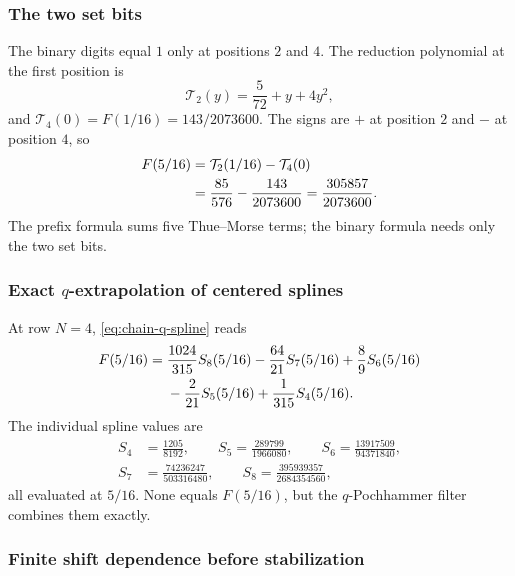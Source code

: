 \documentclass[11pt,oneside]{article}
\theoremstyle{definition}
\theoremstyle{remark}
\begin{document}
\subsubsection{The two set bits}

The binary digits equal $1$ only at positions $2$ and $4$.  The reduction polynomial at the
first position is
\begin{equation}
 \mathcal T_2(y)=\frac5{72}+y+4y^2,                        \label{eq:T2-explicit}
\end{equation}
and
\(
 \mathcal T_4(0)=F(1/16)=143/2073600.
\)
The signs are $+$ at position $2$ and $-$ at position $4$, so
\begin{align}
 F(5/16)
 &=\mathcal T_2(1/16)-\mathcal T_4(0)                     \notag\\
 &=\frac{85}{576}-\frac{143}{2073600}
 =\frac{305857}{2073600}.                                 \label{eq:five-sixteen-binary}
\end{align}
The prefix formula sums five Thue--Morse terms; the binary formula needs only the two set bits.

\subsubsection[Exact q-extrapolation of centered splines]{Exact $q$-extrapolation of centered splines}

At row $N=4$, \eqref{eq:chain-q-spline} reads
\begin{align}
 F(5/16)
 ={}&\frac{1024}{315}S_8(5/16)
 -\frac{64}{21}S_7(5/16)
 +\frac89S_6(5/16)                                      \notag\\
 &-\frac2{21}S_5(5/16)
 +\frac1{315}S_4(5/16).                                  \label{eq:five-sixteen-q-extrap}
\end{align}
The individual spline values are
\begin{equation}
 \begin{split}
 S_4&=\frac{1205}{8192},\qquad
 S_5=\frac{289799}{1966080},\qquad
 S_6=\frac{13917509}{94371840},\\
 S_7&=\frac{74236247}{503316480},\qquad
 S_8=\frac{395939357}{2684354560},
 \end{split}                                               \label{eq:five-sixteen-S4-S8}
\end{equation}
all evaluated at $5/16$.  None equals $F(5/16)$, but the $q$-Pochhammer filter combines them
exactly.

\subsubsection{Finite shift dependence before stabilization}
\end{document}
